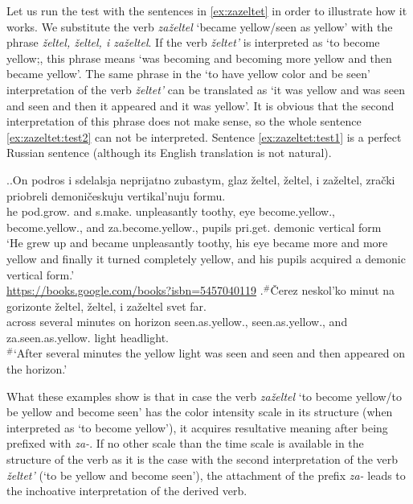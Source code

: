Let us run the test with the sentences in \ref{ex:zazeltet} in order to illustrate how it works. We substitute the verb \textit{za\v{z}eltel} `became yellow/seen as yellow' with the phrase \textit{\v{z}eltel, \v{z}eltel, i za\v{z}eltel}. If the verb \textit{\v{z}eltet'} is interpreted as `to become yellow;, this phrase means `was becoming and becoming more yellow and then became yellow'. The same phrase in the `to have yellow color and be seen' interpretation of the verb \textit{\v{z}eltet'} can be translated as `it was yellow and was seen and seen and then it appeared and it was yellow'. It is obvious that the second interpretation of this phrase does not make sense, so the whole sentence \ref{ex:zazeltet:test2} can not be interpreted. Sentence \ref{ex:zazeltet:test1} is a perfect Russian sentence (although its English translation is not natural).

\ex.\label{ex:zazeltet:test}\ag.\label{ex:zazeltet:test1}On podros i sdelalsja neprijatno zubastym, glaz \v{z}eltel, \v{z}eltel, i za\v{z}eltel, zra\v{c}ki priobreli demoni\v{c}eskuju vertikal'nuju formu.\\
he pod.grow. and s.make. unpleasantly toothy, eye become.yellow., become.yellow., and za.become.yellow., pupils pri.get. demonic vertical form\\
\trans `He grew up and became unpleasantly toothy, his eye became more and more yellow and finally it turned completely yellow, and his pupils acquired a demonic vertical form.'\\\hbox{}\hfill\hbox{\url{https://books.google.com/books?isbn=5457040119}}
\bg.$^\#$\v{C}erez neskol'ko minut na gorizonte \v{z}eltel, \v{z}eltel, i za\v{z}eltel svet far.\label{ex:zazeltet:test2}\\
across several minutes on horizon seen.as.yellow., seen.as.yellow., and za.seen.as.yellow. light headlight.\\
\trans $^\#$`After several minutes the yellow light was seen and seen and then appeared on the horizon.'

What these examples show is that in case the verb \textit{za\v{z}eltel} `to become yellow/to be yellow and become seen' has the color intensity scale in its structure (when interpreted as `to become yellow'), it acquires resultative meaning after being prefixed with \textit{za-}. If no other scale than the time scale is available in the structure of the verb as it is the case with the second interpretation of the verb \textit{\v{z}eltet'} (`to be yellow and become seen'), the attachment of the prefix \textit{za-} leads to the inchoative interpretation of the derived verb.

